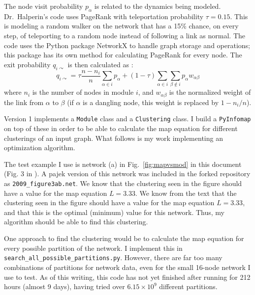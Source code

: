 The node visit probability \(p_{\alpha}\) is related to the dynamics
being modeled. Dr.~Halperin's code uses PageRank with teleportation
probability \(\tau = 0.15\). This is modeling a random walker on the
network that has a 15\% chance, on every step, of teleporting to a
random node instead of following a link as normal. The code uses the
Python package NetworkX  to handle graph storage and
operations; this package has its own method for calculating PageRank for
every node. The exit probability \(q_{i\curvearrowright}\) is then
calculated as \autocite{rosvall_map_2010}:
\[q_{i\curvearrowright} = \tau \frac{n-n_i}{n} \sum_{\alpha \in i}{p_{\alpha}} + (1-\tau) \sum_{\alpha \in i}{\sum_{\beta \notin i}{p_{\alpha}w_{\alpha \beta}}}\]
where \(n_i\) is the number of nodes in module \(i\), and
\(w_{\alpha \beta}\) is the normalized weight of the link from
\(\alpha\) to \(\beta\) (if \(\alpha\) is a dangling node, this weight
is replaced by \(1-n_i/n\)).

Version 1 implements a \texttt{Module} class and a \texttt{Clustering}
class. I build a \texttt{PyInfomap} on top of these in order to be able
to calculate the map equation for different clusterings of an input
graph. What follows is my work implementing an optimization algorithm.

The test example I use is network (a) in Fig.~\ref{fig:mapvsmod} in this
document (Fig. 3 in \autocite{rosvall_map_2010}). A pajek version of
this network was included in the forked repository as
\texttt{2009\_figure3ab.net}. We know that the clustering seen in the
figure should have a value for the map equation \(L = 3.33\). We know
from the text that the clustering seen in the figure should have a value
for the map equation \(L = 3.33\), and that this is the optimal
(minimum) value for this network. Thus, my algorithm should be able to
find this clustering.

One approach to find the clustering would be to calculate the map
equation for every possible partition of the network. I implement this
in \texttt{search\_all\_possible\_partitions.py}. However, there are far
too many combinations of partitions for network data, even for the small
16-node network I use to test. As of this writing, this code has not yet
finished after running for 212 hours (almost 9 days), having tried over
\(6.15 \times 10^9\) different partitions.

